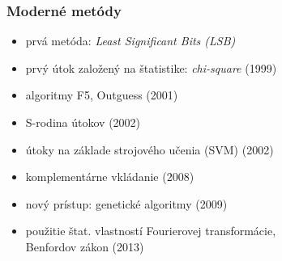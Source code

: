\documentclass{beamer}
\begin{document}

\begin{frame}
    \frametitle{Moderné metódy}
    \begin{itemize}
        \item prvá metóda: \emph{Least Significant Bits (LSB)}
        \item prvý útok založený na štatistike: \emph{chi-square} (1999)
        \item algoritmy F5, Outguess (2001)
        \item S-rodina útokov (2002)
        \item útoky na základe strojového učenia (SVM) (2002)
        \item komplementárne vkládanie (2008)
        \item nový prístup: genetické algoritmy (2009)
        \item použitie štat. vlastností Fourierovej transformácie,\\
            Benfordov zákon (2013)
    \end{itemize}
\end{frame}
\end{document}
